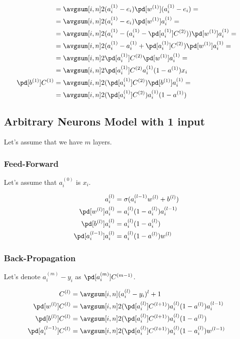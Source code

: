 \documentclass{article}
\begin{document}
\begin{align}
			&= \avgsum[i, n] 2(a_i^{(1)} - e_i) \pd[w^{(1)}] (a_i^{(1)} - e_i) =\\
			&= \avgsum[i, n] 2(a_i^{(1)} - e_i) \pd[w^{(1)}] a_i^{(1)} =\\
			&= \avgsum[i, n] 2(a_i^{(1)} - (a_i^{(1)} - \pd[a_i^{(1)}] C^{(2)})) \pd[w^{(1)}] a_i^{(1)} =\\
			&= \avgsum[i, n] 2(a_i^{(1)} - a_i^{(1)} + \pd[a_i^{(1)}] C^{(2)}) \pd[w^{(1)}] a_i^{(1)} =\\
			&= \avgsum[i, n] 2\pd[a_i^{(1)}] C^{(2)} \pd[w^{(1)}] a_i^{(1)} =\\
			&= \avgsum[i, n] 2\pd[a_i^{(1)}] C^{(2)} a_i^{(1)}(1 - a^{(1)})x_i  \\
		\pd[b^{(1)}] C^{(1)} 
			&= \avgsum[i, n] 2(\pd[a_i^{(1)}] C^{(2)}) \pd[b^{(1)}] a_i^{(1)} =\\
			&= \avgsum[i, n] 2(\pd[a_i^{(1)}] C^{(2)}) a_i^{(1)}(1 - a^{(1)})  \\
	\end{align}

	\subsection{Arbitrary Neurons Model with 1 input}

	Let's assume that we have $m$ layers.

	\subsubsection{Feed-Forward}

	Let's assume that $a_i^{(0)}$ is $x_i$.

	\begin{align}
    	a_i^{(l)} &= \sigma(a_i^{(l-1)}w^{(l)} + b^{(l)}) \\
    	\pd[w^{(l)}] a_i^{(l)} &= a_i^{(l)}(1 - a_i^{(l)}) a_i^{(l-1)} \\
    	\pd[b^{(l)}] a_i^{(l)} &= a_i^{(l)}(1 - a_i^{(l)}) \\
    	\pd[a_i^{(l-1)}]a_i^{(l)} &= a_i^{(l)}(1 - a^{(l)})w^{(l)} \\
	\end{align}

	\subsubsection{Back-Propagation}

	Let's denote $a_i^{(m)} - y_i$ as $\pd[a_i^{(m)}]C^{(m-1)}$.

	\begin{align}
		C^{(l)} &= \avgsum[i, n] (a_i^{(l)} - y_i)^l+1 \\
		\pd[w^{(l)}] C^{(l)} &= \avgsum[i, n] 2(\pd[a_i^{(l)}] C^{(l+1)}) a_i^{(l)}(1 - a^{(l)})a_i^{(l-1)}  \\
		\pd[b^{(l)}] C^{(l)}  &= \avgsum[i, n] 2(\pd[a_i^{(l)}] C^{(l+1)}) a_i^{(l)}(1 - a^{(l)})  \\
		\pd[a_i^{(l-1)}] C^{(l)}  &= \avgsum[i, n] 2(\pd[a_i^{(l)}] C^{(l+1)}) a_i^{(l)}(1 - a_i^{(l)}) w^{(l-1)} \\
	\end{align}
\end{document}
